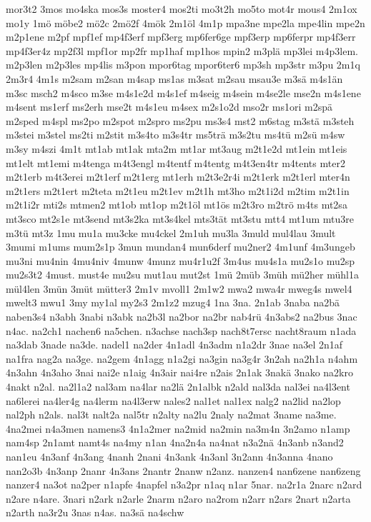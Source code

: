 {mor3t2
3mos
mo4ska
mos3s
moster4
mos2ti
mo3t2h
mo5to
mot4r
mous4
2m1ox
mo1y
1mö
möbe2
mö2c
2mö2f
4mök
2m1öl
4m1p
mpa3ne
mpe2la
mpe4lin
mpe2n
m2p1ene
m2pf
mpf1ef
mp4f3erf
mpf3erg
mp6fer6ge
mpf3erp
mp6ferpr
mp4f3err
mp4f3er4z
mp2f3l
mpf1or
mp2fr
mp1haf
mp1hos
mpin2
m3plä
mp3lei
m4p3lem.
m2p3len
m2p3les
mp4lis
m3pon
mpor6tag
mpor6ter6
mp3sh
mp3str
m3pu
2m1q
2m3r4
4m1s
m2sam
m2san
m4sap
ms1as
m3sat
m2sau
msau3e
m3sä
m4s1än
m3sc
msch2
m4sco
m3se
m4s1e2d
m4s1ef
m4seig
m4sein
m4se2le
mse2n
m4s1ene
m4sent
ms1erf
ms2erh
mse2t
m4s1eu
m4sex
m2s1o2d
mso2r
ms1ori
m2spä
m2sped
m4spl
ms2po
m2spot
m2spro
ms2pu
ms3s4
mst2
m6stag
m3stä
m3steh
m3stei
m3stel
ms2ti
m2stit
m3s4to
m3s4tr
ms5trä
m3s2tu
ms4tü
m2sü
m4sw
m3sy
m4szi
4m1t
mt1ab
mt1ak
mta2m
mt1ar
mt3aug
m2t1e2d
mt1ein
mt1eis
mt1elt
mt1emi
m4tenga
m4t3engl
m4tentf
m4tentg
m4t3en4tr
m4tents
mter2
m2t1erb
m4t3erei
m2t1erf
m2t1erg
mt1erh
m2t3e2r4i
m2t1erk
m2t1erl
mter4n
m2t1ers
m2t1ert
m2teta
m2t1eu
m2t1ev
m2t1h
mt3ho
m2t1i2d
m2tim
m2t1in
m2t1i2r
mti2s
mtmen2
mt1ob
mt1op
m2t1öl
mt1ös
m2t3ro
m2trö
m4ts
mt2sa
mt3sco
mt2s1e
mt3send
mt3s2ka
mt3s4kel
mts3tät
mt3stu
mtt4
mt1um
mtu3re
m3tü
mt3z
1mu
mu1a
mu3cke
mu4ckel
2m1uh
mu3la
3muld
mul4lau
3mult
3mumi
m1ums
mum2s1p
3mun
mundan4
mun6derf
mu2ner2
4m1unf
4m3ungeb
mu3ni
mu4nin
4mu4niv
4munw
4munz
mu4r1u2f
3m4us
mu4s1a
mu2s1o
mu2sp
mu2s3t2
4must.
must4e
mu2su
mut1au
mut2st
1mü
2müb
3müh
mü2her
mühl1a
mül4len
3mün
3müt
mütter3
2m1v
mvoll1
2m1w2
mwa2
mwa4r
mweg4s
mwel4
mwelt3
mwu1
3my
my1al
my2s3
2m1z2
mzug4
1na
3na.
2n1ab
3naba
na2bä
naben3s4
n3abh
3nabi
n3abk
na2b3l
na2bor
na2br
nab4rü
4n3abs2
na2bus
3nac
n4ac.
na2ch1
nachen6
na5chen.
n3achse
nach3sp
nach8t7ersc
nacht8raum
n1ada
na3dab
3nade
na3de.
nadel1
na2der
4n1adl
4n3adm
n1a2dr
3nae
na3el
2n1af
na1fra
nag2a
na3ge.
na2gem
4n1agg
n1a2gi
na3gin
na3g4r
3n2ah
na2h1a
n4ahm
4n3ahn
4n3aho
3nai
nai2e
n1aig
4n3air
nai4re
n2ais
2n1ak
3nakä
3nako
na2kro
4nakt
n2al.
na2l1a2
nal3am
na4lar
na2lä
2n1albk
n2ald
nal3da
nal3ei
na4l3ent
na6lerei
na4ler4g
na4lerm
na4l3erw
nales2
nal1et
nal1ex
nalg2
na2lid
na2lop
nal2ph
n2als.
nal3t
nalt2a
nal5tr
n2alty
na2lu
2naly
na2mat
3name
na3me.
4na2mei
n4a3men
namens3
4n1a2mer
na2mid
na2min
na3m4n
3n2amo
n1amp
nam4sp
2n1amt
namt4s
na4my
n1an
4na2n4a
na4nat
n3a2nä
4n3anb
n3and2
nan1eu
4n3anf
4n3ang
4nanh
2nani
4n3ank
4n3anl
3n2ann
4n3anna
4nano
nan2o3b
4n3anp
2nanr
4n3ans
2nantr
2nanw
n2anz.
nanzen4
nan6zene
nan6zeng
nanzer4
na3ot
na2per
n1apfe
4napfel
n3a2pr
n1aq
n1ar
5nar.
na2r1a
2narc
n2ard
n2are
n4are.
3nari
n2ark
n2arle
2narm
n2aro
na2rom
n2arr
n2ars
2nart
n2arta
n2arth
na3r2u
3nas
n4as.
na3sä
na4schw
}
